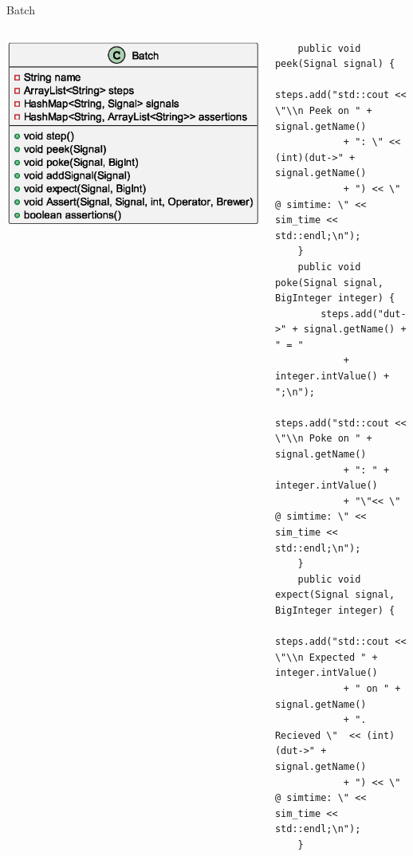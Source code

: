 \documentclass[aspectratio=169, handout]{beamer}
\begin{document}
\begin{frame}[containsverbatim]{Batch}
    \begin{columns}[T]
        \begin{column}{.2\textwidth}
            \includegraphics[width=\columnwidth]{out/plantuml/BatchClass/BatchClass.eps}
        \end{column}
        \begin{column}{.8\textwidth}
            \begin{verbatim}
    public void peek(Signal signal) {
        steps.add("std::cout << \"\\n Peek on " + signal.getName()
            + ": \" << (int)(dut->" + signal.getName()
            + ") << \" @ simtime: \" << sim_time << std::endl;\n");
    }
    public void poke(Signal signal, BigInteger integer) {
        steps.add("dut->" + signal.getName() + " = "
            + integer.intValue() + ";\n");
        steps.add("std::cout << \"\\n Poke on " + signal.getName()
            + ": " + integer.intValue()
            + "\"<< \" @ simtime: \" << sim_time << std::endl;\n");
    }
    public void expect(Signal signal, BigInteger integer) {
        steps.add("std::cout << \"\\n Expected " + integer.intValue()
            + " on " + signal.getName()
            + ". Recieved \"  << (int)(dut->" + signal.getName()
            + ") << \" @ simtime: \" << sim_time << std::endl;\n");
    }
            \end{verbatim}
        \end{column}
    \end{columns}
\end{frame}
\end{document}

